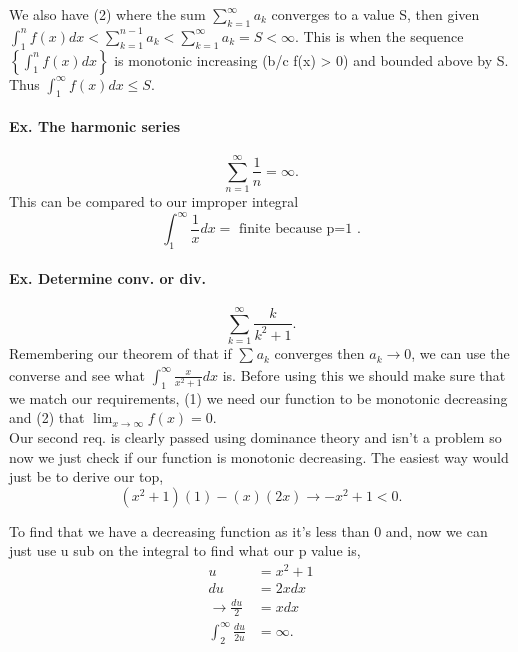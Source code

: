 We also have (2) where the sum $ \sum_{ k=1 } ^{ \infty } a_k $ converges to a value S, then given $ \int_{ 1 }^{ n } f\left( x \right) dx <\sum_{ k=1 } ^{ n-1 } a_k<\sum_{ k=1 } ^{ \infty } a_k=S<\infty$. This is when the sequence $ \left\{ \int_{ 1 }^{ n } f\left( x \right) dx \right\}  $ is monotonic increasing (b/c f(x) > 0) and bounded above by S. Thus $ \int_{ 1 }^{ \infty } f\left( x \right) dx\le S $.

\paragraph{Ex. The harmonic series}
\[
\sum_{ n=1 } ^{ \infty } \frac{ 1 }{ n } =\infty
.\] 
This can be compared to our improper integral
\[
\int_{ 1 }^{ \infty } \frac{ 1 }{ x } dx= \text{ finite because p=1 }
.\] 

\paragraph{Ex. Determine conv. or div.}
\[
\sum_{ k=1 } ^{ \infty } \frac{ k }{ k^2+1 } 
.\] 
Remembering our theorem of that if $ \sum_{  } ^{  } a_k $ converges then $ a_k\to 0 $, we can use the converse and see what $ \int_{ 1 }^{ \infty } \frac{ x }{ x^2+1 } dx $ is. Before using this we should make sure that we match our requirements, (1) we need our function to be monotonic decreasing and (2) that $ \lim_{ x \to \infty} f\left( x \right) =0 $. \\

Our second req. is clearly passed using dominance theory and isn't a problem so now we just check if our function is monotonic decreasing. The easiest way would just be to derive our top,
\[
\left( x^2+1 \right) \left( 1 \right) -\left( x \right) \left( 2x \right) \to -x^2+1<0
.\] 

To find that we have a decreasing function as it's less than 0 and, now we can just use u sub on the integral to find what our p value is,
\begin{align*}
u&= x^2+1 \\
du&= 2xdx \\
\to \frac{ du }{ 2 } &= xdx \\
\int_{ 2 }^{ \infty } \frac{ du }{ 2u } &= \infty
.\end{align*}

